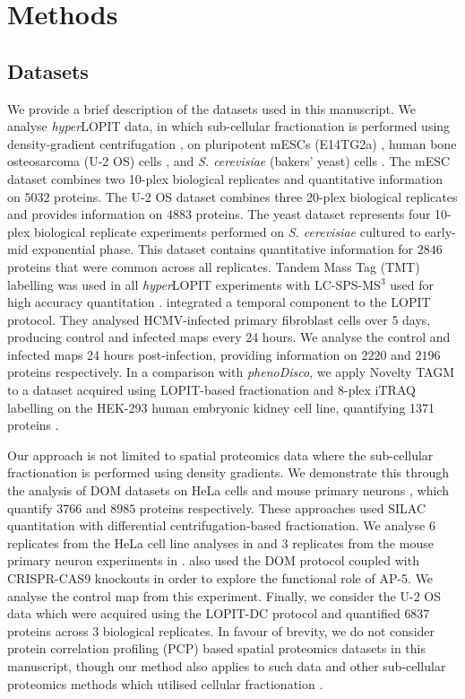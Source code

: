 \documentclass[12pt,english]{article}
\begin{document}
\section*{Methods}
\subsection*{Datasets}
We provide a brief description of the datasets used in this manuscript. We analyse \textit{hyper}LOPIT data, in which sub-cellular fractionation is performed using density-gradient centrifugation \citep{Dunkley:2004, Dunkley:2006, Mulvey:2017}, on pluripotent mESCs (E14TG2a) \citep{hyper}, human bone osteosarcoma (U-2 OS) cells \citep{Thul:2017, DC:2018}, and \textit{S. cerevisiae} (bakers' yeast) cells \citep{Nightingale::2019}. The mESC dataset combines two 10-plex biological replicates and quantitative information on $5032$ proteins. The U-2 OS dataset combines three 20-plex biological replicates and provides information on $4883$ proteins. The yeast dataset represents four 10-plex biological replicate experiments performed on \textit{S. cerevisiae} cultured to early-mid exponential phase. This dataset contains quantitative information for $2846$ proteins that were common across all replicates. Tandem Mass Tag (TMT) \citep{Thompson:2003} labelling was used in all \textit{hyper}LOPIT experiments with LC-SPS-MS$^{3}$ used for high accuracy quantitation \citep{Ting:2011, Mcalister::2014}. \cite{Jean_Beltran:2016} integrated a temporal component to the LOPIT protocol. They analysed HCMV-infected primary fibroblast cells over 5 days, producing control and infected maps every 24 hours. We analyse the control and infected maps 24 hours post-infection, providing information on $2220$ and $2196$ proteins respectively. In a comparison with \textit{phenoDisco}, we apply Novelty TAGM to a dataset acquired using LOPIT-based fractionation and 8-plex iTRAQ labelling on the HEK-293 human embryonic kidney cell line, quantifying 1371 proteins \citep{Breckels:2013}.

Our approach is not limited to spatial proteomics data where the sub-cellular fractionation is performed using density gradients. We demonstrate this through the analysis of DOM datasets on HeLa cells and mouse primary neurons \citep{Itzhak:2016, Itzhak::2017}, which quantify $3766$ and $8985$ proteins respectively. These approaches used SILAC quantitation with differential centrifugation-based fractionation. We analyse $6$ replicates from the HeLa cell line analyses in \cite{Itzhak:2016} and $3$ replicates from the mouse primary neuron experiments in \cite{Itzhak::2017}. \cite{Hirst:2018} also used the DOM protocol coupled with CRISPR-CAS9 knockouts in order to explore the functional role of AP-5. We analyse the control map from this experiment. Finally, we consider the U-2 OS data which were acquired using the LOPIT-DC protocol \citep{DC:2018} and quantified $6837$ proteins across $3$ biological replicates. In favour of brevity, we do not consider protein correlation profiling (PCP) based spatial proteomics datasets in this manuscript, though our method also applies to such data \citep{Foster:2006, kristensen:2012, kristensen:2014} and other sub-cellular proteomics methods which utilised cellular fractionation \citep{Orre:2019}.
\end{document}
